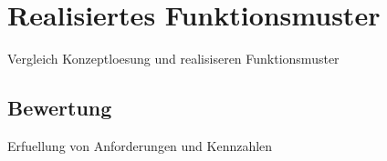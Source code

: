 \section{Realisiertes Funktionsmuster}

Vergleich  Konzeptloesung und realisiseren Funktionsmuster

\subsection{Bewertung}

Erfuellung von Anforderungen und Kennzahlen
